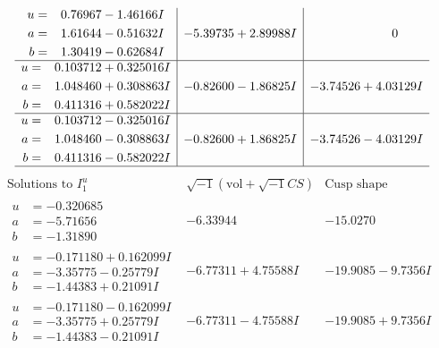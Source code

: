 \documentclass[1p]{elsarticle_modified}
\theoremstyle{definition}
\newcommand{\I}{\sqrt{-1}}
\begin{document}
$$\begin{array}{c|c|c}
\begin{aligned}
u &= \phantom{-}0.76967 - 1.46166 I \\
a &= \phantom{-}1.61644 - 0.51632 I \\
b &= \phantom{-}1.30419 - 0.62684 I\end{aligned}
 & -5.39735 + 2.89988 I & \phantom{-0.000000 } 0 \\ \hline\begin{aligned}
u &= \phantom{-}0.103712 + 0.325016 I \\
a &= \phantom{-}1.048460 + 0.308863 I \\
b &= \phantom{-}0.411316 + 0.582022 I\end{aligned}
 & -0.82600 - 1.86825 I & -3.74526 + 4.03129 I \\ \hline\begin{aligned}
u &= \phantom{-}0.103712 - 0.325016 I \\
a &= \phantom{-}1.048460 - 0.308863 I \\
b &= \phantom{-}0.411316 - 0.582022 I\end{aligned}
 & -0.82600 + 1.86825 I & -3.74526 - 4.03129 I\\
 \hline 
 \end{array}$$\newpage$$\begin{array}{c|c|c}  
\text{Solutions to }I^u_{1}& \I (\text{vol} + \sqrt{-1}CS) & \text{Cusp shape}\\
 \hline 
\begin{aligned}
u &= -0.320685\phantom{ +0.000000I} \\
a &= -5.71656\phantom{ +0.000000I} \\
b &= -1.31890\phantom{ +0.000000I}\end{aligned}
 & -6.33944\phantom{ +0.000000I} & -15.0270\phantom{ +0.000000I} \\ \hline\begin{aligned}
u &= -0.171180 + 0.162099 I \\
a &= -3.35775 - 0.25779 I \\
b &= -1.44383 + 0.21091 I\end{aligned}
 & -6.77311 + 4.75588 I & -19.9085 - 9.7356 I \\ \hline\begin{aligned}
u &= -0.171180 - 0.162099 I \\
a &= -3.35775 + 0.25779 I \\
b &= -1.44383 - 0.21091 I\end{aligned}
 & -6.77311 - 4.75588 I & -19.9085 + 9.7356 I \\ \hline\begin{aligned}

\end{aligned}
\end{array}$$
\end{document}
